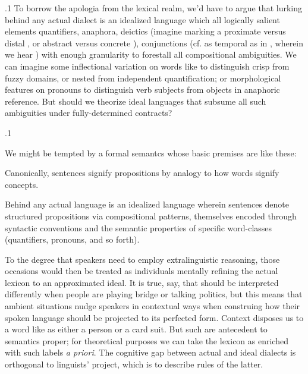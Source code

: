 \documentclass[11pt, twocolumn]{article}
\begin{document}
\p.1{%
To borrow the apologia from the lexical realm, we'd have to argue that
lurking behind any actual dialect is an idealized language which
 all logically salient elements \mdash{} quantifiers, anaphora, deictics
(imagine marking a proximate versus distal , or abstract versus concrete
),
conjunctions (cf.  as temporal as in ,
wherein we hear ) \mdash{} with enough granularity to forestall
all compositional ambiguities.  We can imagine some inflectional variation
on words like  to distinguish crisp from fuzzy domains, or nested from
independent quantification; or morphological features on pronouns to
distinguish verb subjects from objects in anaphoric reference.  But
should we theorize ideal languages that subsume all such ambiguities
under fully-determined contracts?
} %

\p.1{%
We might be tempted by a formal semantcs whose basic premises are like these:

\begin{enums}

\enumsItem{}   Canonically, sentences signify propositions \mdash{} by analogy to how words signify concepts.
 
\enumsItem{}   Behind any actual language is an idealized language wherein sentences denote
structured propositions via compositional patterns, themselves encoded through
syntactic conventions and the semantic properties of specific word-classes
(quantifiers, pronouns, and so forth).

\end{enums}

\nip
To the degree that speakers need to employ extralinguistic reasoning,
those occasions would then be treated as individuals mentally refining the
actual lexicon to an approximated ideal.
It is true, say, that  should be interpreted differently
when people are playing bridge or talking politics, but this means that
ambient situations nudge speakers in contextual ways when construing how
their spoken language should be projected to its perfected form.  Context
disposes us to  a word like  as either a person or a card
suit.  But such are antecedent to semantics proper; for theoretical
purposes we can take the lexicon as enriched with such labels \textit{a priori}.
The cognitive gap between actual and ideal dialects is orthogonal to linguists'
project, which is to describe rules of the latter.
} %
\end{document}
